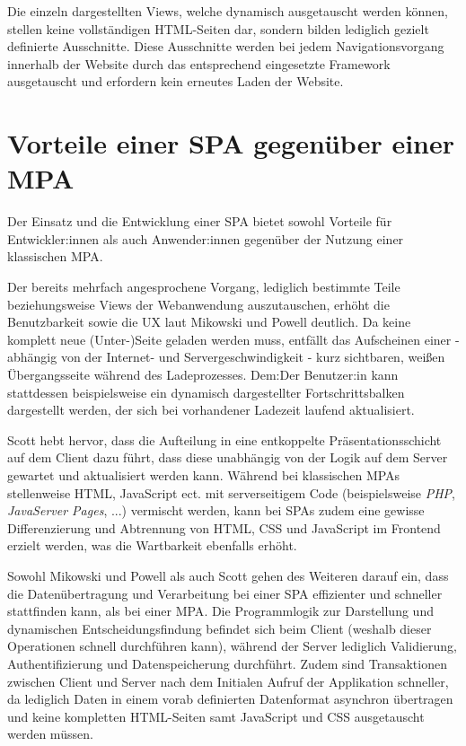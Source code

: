 \documentclass[a4paper,12pt,twoside]{scrreprt}
\begin{document}
\medskip

Die einzeln dargestellten Views, welche dynamisch ausgetauscht werden können, stellen keine vollständigen HTML-Seiten dar, sondern bilden lediglich gezielt definierte Ausschnitte. Diese Ausschnitte werden bei jedem Navigationsvorgang innerhalb der Website durch das entsprechend eingesetzte Framework ausgetauscht und erfordern kein erneutes Laden der Website. \parencite[][Seite 10f.]{scott_spa_2015}

\section{Vorteile einer \acs{SPA} gegenüber einer \acs{MPA}}
\label{sec:vorteile-spa-mpa}
Der Einsatz und die Entwicklung einer \acl{SPA} bietet sowohl Vorteile für Entwickler:innen als auch Anwender:innen gegenüber der Nutzung einer klassischen \acl{MPA}.

Der bereits mehrfach angesprochene Vorgang, lediglich bestimmte Teile beziehungsweise Views der Webanwendung auszutauschen, erhöht die Benutzbarkeit sowie die \ac{UX} laut Mikowski und Powell deutlich. Da keine komplett neue (Unter-)Seite geladen werden muss, entfällt das Aufscheinen einer - abhängig von der Internet- und Servergeschwindigkeit - kurz sichtbaren, weißen Übergangsseite während des Ladeprozesses. Dem:Der Benutzer:in kann stattdessen beispielsweise ein dynamisch dargestellter Fortschrittsbalken dargestellt werden, der sich bei vorhandener Ladezeit laufend aktualisiert. \parencite[][Seite 20]{mikowski_single_2013}

Scott hebt hervor, dass die Aufteilung in eine entkoppelte Präsentationsschicht auf dem Client dazu führt, dass diese unabhängig von der Logik auf dem Server gewartet und aktualisiert werden kann. Während bei klassischen \acsp{MPA} stellenweise HTML, JavaScript ect. mit serverseitigem Code (beispielsweise \textit{PHP}, \textit{JavaServer Pages}, ...) vermischt werden, kann bei \acsp{SPA} zudem eine gewisse Differenzierung und Abtrennung von HTML, CSS und JavaScript im Frontend erzielt werden, was die Wartbarkeit ebenfalls erhöht. \parencite[][Seite 13]{scott_spa_2015}

\newpage

Sowohl Mikowski und Powell als auch Scott gehen des Weiteren darauf ein, dass die Datenübertragung und Verarbeitung bei einer \acl{SPA} effizienter und schneller stattfinden kann, als bei einer \acl{MPA}. Die Programmlogik zur Darstellung und dynamischen Entscheidungsfindung befindet sich beim Client (weshalb dieser Operationen schnell durchführen kann), während der Server lediglich Validierung, Authentifizierung und Datenspeicherung durchführt. \parencite[][Seite 20]{mikowski_single_2013} Zudem sind Transaktionen zwischen Client und Server nach dem Initialen Aufruf der Applikation schneller, da lediglich Daten in einem vorab definierten Datenformat asynchron übertragen und keine kompletten HTML-Seiten samt JavaScript und CSS ausgetauscht werden müssen. \parencite[][Seite 21]{mikowski_single_2013}
\end{document}
